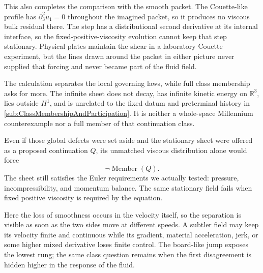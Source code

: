 This also completes the comparison with the smooth packet.
The Couette-like profile has \(\partial_3^2u_1=0\) throughout the imagined packet, so it produces no viscous bulk residual there.
The step has a distributional second derivative at its internal interface, so the fixed-positive-viscosity evolution cannot keep that step stationary.
Physical plates maintain the shear in a laboratory Couette experiment, but the lines drawn around the packet in either picture never supplied that forcing and never became part of the fluid field.

The calculation separates the local governing laws, while full class membership asks for more.
The infinite sheet does not decay, has infinite kinetic energy on \(\mathbb R^3\), lies outside \(H^1\), and is unrelated to the fixed datum and preterminal history in \cref{sub:ClassMembershipAndParticipation}.
It is neither a whole-space Millennium counterexample nor a full member of that continuation class.

Even if those global defects were set aside and the stationary sheet were offered as a proposed continuation \(Q\), its unmatched viscous distribution alone would force
\[
  \neg\operatorname{Member}(Q).
\]
The sheet still satisfies the Euler requirements we actually tested: pressure, incompressibility, and momentum balance.
The same stationary field fails when fixed positive viscosity is required by the \NavierStokes{} equation.

Here the loss of smoothness occurs in the velocity itself, so the separation is visible as soon as the two sides move at different speeds.
A subtler field may keep its velocity finite and continuous while its gradient, material acceleration, jerk, or some higher mixed derivative loses finite control.
The board-like jump exposes the lowest rung; the same class question remains when the first disagreement is hidden higher in the response of the fluid.
